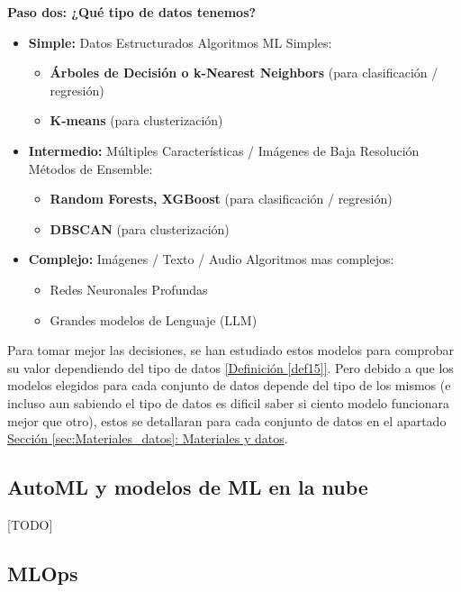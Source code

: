 \textbf{Paso dos: ¿Qué tipo de datos tenemos?}
	\begin{itemize}
		\item \textbf{Simple:} Datos Estructurados \textrightarrow \space Algoritmos ML Simples:
		\begin{itemize}
			\item \textbf{Árboles de Decisión o k-Nearest Neighbors} (para clasificación / regresión)
			\item \textbf{K-means} (para clusterización)
		\end{itemize}
		\item \textbf{Intermedio:} Múltiples Características / Imágenes de Baja Resolución \textrightarrow \space Métodos de Ensemble:
		\begin{itemize}
			\item \textbf{ Random Forests, XGBoost }  (para clasificación / regresión)
			\item \textbf{DBSCAN} (para clusterización)
		\end{itemize}
		\item \textbf{Complejo:} Imágenes / Texto / Audio \textrightarrow \space Algoritmos mas complejos:
		\begin{itemize}
			\item Redes Neuronales Profundas
			\item Grandes modelos de Lenguaje (LLM)
		\end{itemize}
	\end{itemize}

Para tomar mejor las decisiones, se han estudiado estos modelos para comprobar su valor dependiendo del tipo de datos \hyperref[def15]{[Definición \ref*{def15}]}. Pero debido a que los modelos elegidos para cada conjunto de datos depende del tipo de los mismos (e incluso aun sabiendo el tipo de datos es dificil saber si ciento modelo funcionara mejor que otro), estos se detallaran para cada conjunto de datos en el apartado \hyperref[sec:Materiales_datos]{Sección \ref*{sec:Materiales_datos}: Materiales y datos}.

\subsection{AutoML y modelos de ML en la nube}

[TODO]

\subsection{MLOps}

